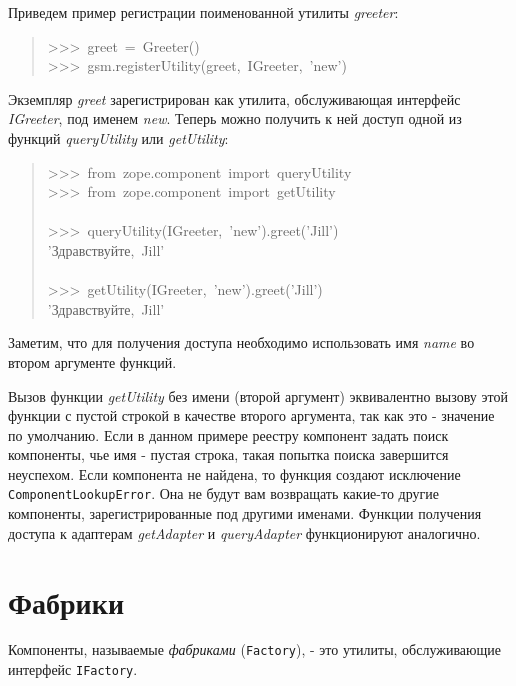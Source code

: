 \documentclass[a4paper,openany,twoside,final]{book}
\providecommand*{\DUroletitlereference}[1]{\textsl{#1}}
\begin{document}
Приведем пример регистрации поименованной утилиты \DUroletitlereference{greeter}:

\begin{quote}{\ttfamily \raggedright \noindent
>{}>{}>~greet~=~Greeter()\\
>{}>{}>~gsm.registerUtility(greet,~IGreeter,~'new')
}
\end{quote}

Экземпляр \DUroletitlereference{greet} зарегистрирован как утилита, обслуживающая
интерфейс \DUroletitlereference{IGreeter}, под именем \DUroletitlereference{new}.  Теперь можно получить к ней
доступ одной из функций \DUroletitlereference{queryUtility} или \DUroletitlereference{getUtility}:

\begin{quote}{\ttfamily \raggedright \noindent
>{}>{}>~from~zope.component~import~queryUtility\\
>{}>{}>~from~zope.component~import~getUtility\\
~\\
>{}>{}>~queryUtility(IGreeter,~'new').greet('Jill')\\
'Здравствуйте,~Jill'\\
~\\
>{}>{}>~getUtility(IGreeter,~'new').greet('Jill')\\
'Здравствуйте,~Jill'
}
\end{quote}

Заметим, что для получения доступа необходимо использовать имя \DUroletitlereference{name}
во втором аргументе функций.

Вызов функции \DUroletitlereference{getUtility} без имени (второй аргумент) эквивалентно
вызову этой функции с пустой строкой в качестве второго аргумента, так
как это - значение по умолчанию.  Если в данном примере реестру
компонент задать поиск компоненты, чье имя - пустая строка, такая
попытка поиска завершится неуспехом.  Если компонента не найдена, то
функция создают исключение \texttt{ComponentLookupError}.  Она не будут вам
возвращать какие-то другие компоненты, зарегистрированные под другими
именами.  Функции получения доступа к адаптерам \DUroletitlereference{getAdapter} и
\DUroletitlereference{queryAdapter} функционируют аналогично.


\section{Фабрики%
  \label{id43}%
}

Компоненты, называемые \DUroletitlereference{фабриками} (\texttt{Factory}), - это утилиты,
обслуживающие интерфейс \texttt{IFactory}.
\end{document}
